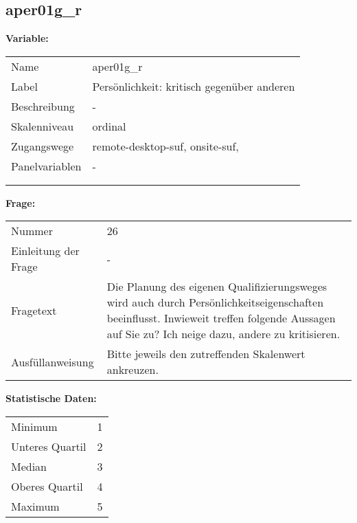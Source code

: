 	
	
	\subsection{aper01g\_r}
	\label{subSection:aper01g_r}

	\noindent\textbf{Variable:}\\
		\begin{tabular}{lL{11.3cm}}
			\label{tableVariable:aper01g_r}
			Name & aper01g\_r \\
			Label & Persönlichkeit: kritisch gegenüber anderen \\
			Beschreibung & - \\
			Skalenniveau & ordinal \\
			Zugangswege &
				remote-desktop-suf,
				onsite-suf,
 \\
			Panelvariablen & -
			 \\
			 \\
 \\
		\end{tabular}

		\vspace*{1 cm}
		\noindent\textbf{Frage:}\\
		\begin{tabular}{lL{11.3cm}}
			\label{tableQuestion:aper01g_r}
			Nummer & 26 \\
			Einleitung der Frage & - \\
			Fragetext & Die Planung des eigenen Qualifizierungsweges wird auch durch Persönlichkeitseigenschaften beeinflusst. Inwieweit treffen folgende Aussagen auf Sie zu?
Ich neige dazu, andere zu kritisieren. \\
			Ausfüllanweisung & Bitte jeweils den zutreffenden
Skalenwert ankreuzen. \\
		\end{tabular}


		\vspace*{1 cm}
		\noindent\textbf{Statistische Daten:}\\
			\begin{tabular}{ll}
				\label{tableStatistics:aper01g_r}
					Minimum & 1 \\
					Unteres Quartil & 2 \\
					Median & 3 \\
					Oberes Quartil & 4 \\
					Maximum & 5 \\
			\end{tabular}



